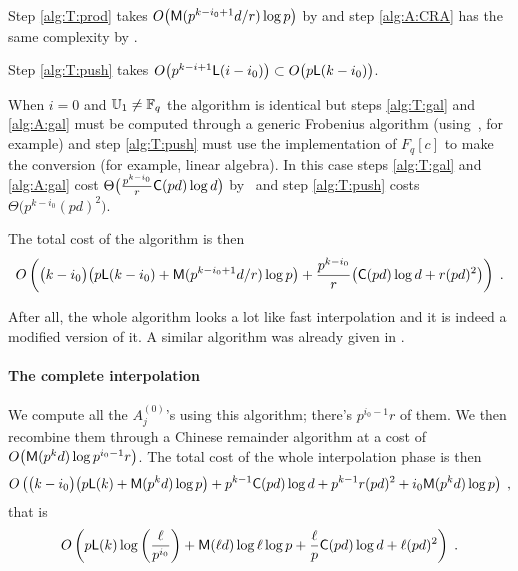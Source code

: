 Step \ref{alg:T:prod} takes $O\bigl(\mathrm{\sf M}(p^{k-i_0+1}d/r)\log p\bigr)$
by \cite[Lemma 10.4]{vzGG} and step \ref{alg:A:CRA} has the same
complexity by \cite[Coro. 10.17]{vzGG}.

Step \ref{alg:T:push} takes $O\bigl(p^{k-i+1}{\sf L}(i-i_0)\bigr)
\subset O\bigl(p{\sf L}(k-i_0)\bigr)$.

When $i=0$ and $\mathbb{U}_1\ne\mathbb{F}_q$ the algorithm is identical but steps
\ref{alg:T:gal} and \ref{alg:A:gal} must be computed through a generic
Frobenius algorithm (using~\cite[Algorithm 5.2]{vzGS92}, for example)
and step \ref{alg:T:push} must use the implementation of $F_q[c]$ to
make the conversion (for example, linear algebra). In this case steps
\ref{alg:T:gal} and \ref{alg:A:gal} cost
$\Theta\bigl(\frac{p^{k-i_0}}{r}\mathrm{\sf C}(pd)\log d \bigr)$
by~\cite[Lemma 5.3]{vzGS92} and step \ref{alg:T:push} costs
$\Theta\bigl(p^{k-i_0}(pd)^2\bigr)$.

The total cost of the algorithm is then
\begin{equation*}
  \label{eq:T:complexity}
  O\left(\bigl(k-i_0\bigr)\bigl(p{\sf L}(k-i_0) + \mathrm{\sf M}(p^{k-i_0+1}d/r)\log p\bigr) +
    \frac{p^{k-i_0}}{r}\bigl(\mathrm{\sf C}(pd)\log d + r(pd)^2\bigr) \right)
  \;\text{.}
\end{equation*}

After all, the whole algorithm looks a lot like fast interpolation
\cite[$\S$10]{vzGG} and it is indeed a modified version of it. A
similar algorithm was already given in \cite{EnMo03}.


\paragraph{The complete interpolation}
We compute all the $A_j^{(0)}$'s using this algorithm; there's
$p^{i_0-1}r$ of them. We then recombine them through a Chinese
remainder algorithm at a cost of $O\bigl(\mathrm{\sf M}(p^kd)\log
p^{i_0-1}r\bigr)$. The total cost of the whole interpolation phase is
then
\begin{equation*}
  O\left(\bigl(k-i_0\bigr) \bigl(p{\sf L}(k) + \mathrm{\sf M}(p^kd)\log p\bigr) +
    p^{k-1}\mathrm{\sf C}(pd)\log d + p^{k-1}r(pd)^2 + i_0\mathrm{\sf M}(p^kd)\log p
  \right)
  \;\text{,}
\end{equation*}
that is
\begin{equation}
  \label{eq:interp}
  O\left(p{\sf L}(k)\log\left(\frac{\ell}{p^{i_0}}\right) + 
    \mathrm{\sf M}(\ell d)\log\ell\log p +
    \frac{\ell}{p}\mathrm{\sf C}(pd)\log d +
    \ell (pd)^2
  \right)
  \;\text{.}
\end{equation}


